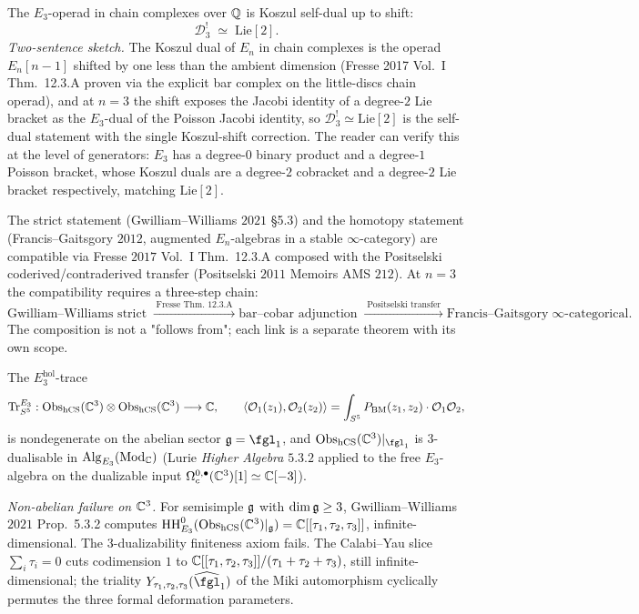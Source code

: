 \begin{theorem}
\label{wn:thm:spine-E3-koszul}
The $E_3$-operad in chain complexes over $\mathbb{Q}$ is Koszul self-dual up
to shift:
\[
\mathcal{D}_3^! \;\simeq\; \mathrm{Lie}[2].
\]
\emph{Two-sentence sketch.} The Koszul dual of $E_n$ in chain complexes
is the operad $E_n[n-1]$ shifted by one less than the ambient dimension
(Fresse 2017 Vol.~I Thm.~12.3.A proven via the explicit bar complex on
the little-discs chain operad), and at $n=3$ the shift exposes the
Jacobi identity of a degree-$2$ Lie bracket as the $E_3$-dual of the
Poisson Jacobi identity, so $\mathcal{D}_3^! \simeq \mathrm{Lie}[2]$
is the self-dual statement with the single Koszul-shift correction.
The reader can verify this at the level of generators: $E_3$ has a
degree-$0$ binary product and a degree-$1$ Poisson bracket, whose
Koszul duals are a degree-$2$ cobracket and a degree-$2$ Lie bracket
respectively, matching $\mathrm{Lie}[2]$.

The strict statement (Gwilliam--Williams $2021$ \S 5.3) and the
homotopy statement (Francis--Gaitsgory $2012$, augmented $E_n$-algebras
in a stable $\infty$-category) are compatible via
Fresse $2017$ Vol.~I Thm.~12.3.A composed with the Positselski
coderived/contraderived transfer (Positselski $2011$ Memoirs AMS
$212$). At $n = 3$ the compatibility requires a three-step chain:
\[
\text{Gwilliam--Williams strict}
\;\xrightarrow{\;\text{Fresse Thm.~12.3.A}\;}
\text{bar--cobar adjunction}
\;\xrightarrow{\;\text{Positselski transfer}\;}
\text{Francis--Gaitsgory}\;\infty\text{-categorical}.
\]
The composition is not a "follows from"; each link is a separate
theorem with its own scope.
\end{theorem}

\begin{theorem}
\label{wn:thm:spine-3-dual-abelian}
The $E_3^{\mathrm{hol}}$-trace
\[
\mathrm{Tr}^{E_3}_{S^5} : \mathrm{Obs}_{\mathrm{hCS}}(\mathbb{C}^3) \otimes \mathrm{Obs}_{\mathrm{hCS}}(\mathbb{C}^3)
\longrightarrow \mathbb{C},\qquad
\langle \mathcal{O}_1(z_1), \mathcal{O}_2(z_2)\rangle = \int_{S^5}
P_{\mathrm{BM}}(z_1, z_2) \cdot \mathcal{O}_1 \mathcal{O}_2,
\]
is nondegenerate on the abelian sector $\fg = \fgl_1$, and
$\Obs_{\hCS}(\CC^3)|_{\fgl_1}$ is $3$-dualisable in
$\mathrm{Alg}_{E_3}(\mathrm{Mod}_{\mathbb{C}})$ (Lurie \emph{Higher Algebra}
$5.3.2$ applied to the free $E_3$-algebra on the dualizable input
$\Omega^{0,\bullet}_c(\mathbb{C}^3)[1] \simeq \mathbb{C}[-3]$).

\emph{Non-abelian failure on $\mathbb{C}^3$.} For semisimple $\mathfrak{g}$ with
$\dim\mathfrak{g} \geq 3$, Gwilliam--Williams $2021$ Prop.~5.3.2 computes
$\mathrm{HH}^0_{E_3}(\mathrm{Obs}_{\mathrm{hCS}}(\mathbb{C}^3)|_{\mathfrak{g}}) = \mathbb{C}[[\tau_1, \tau_2,
\tau_3]]$, infinite-dimensional. The 3-dualizability finiteness
axiom fails. The Calabi--Yau slice $\sum_i \tau_i = 0$ cuts
codimension $1$ to $\mathbb{C}[[\tau_1, \tau_2, \tau_3]]/(\tau_1 + \tau_2 +
\tau_3)$, still infinite-dimensional; the triality $Y_{\tau_1, \tau_2,
\tau_3}(\widehat{\fgl}_1)$ of the Miki automorphism cyclically
permutes the three formal deformation parameters.
\end{theorem}


